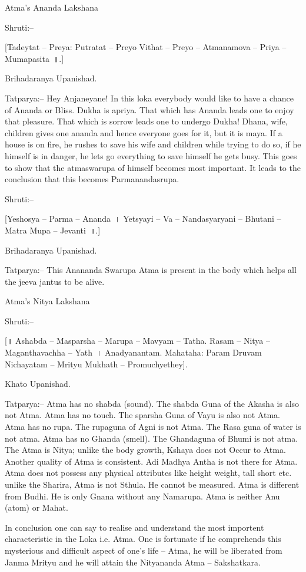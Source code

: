 Atma's Ananda Lakshana

Shruti:–

[Tadeytat – Preya: Putratat – Preyo Vithat – Preyo – Atmanamova – Priya – Mumapasita~॥.]

Brihadaranya Upanishad.

Tatparya:– Hey Anjaneyane! In this loka everybody would like to have a chance of Ananda or Bliss. Dukha is apriya. That which has Ananda leads one to enjoy that pleasure. That which is sorrow leads one to undergo Dukha! Dhana, wife, children gives one ananda and hence everyone goes for it, but it is maya. If a house is on fire, he rushes to save his wife and children while trying to do so, if he himself is in danger, he lets go everything to save himself he gets busy. This goes to show that the atmaswarupa of himself becomes most important. It leads to the conclusion that this becomes Parmanandasrupa.

Shruti:–

[Yeshosya – Parma – Ananda~। Yetsyayi – Va – Nandasyaryani – Bhutani – Matra Mupa – Jevanti~॥.]

Brihadaranya Upanishad.

Tatparya:– This Anananda Swarupa Atma is present in the body which helps all the jeeva jantus to be alive.

Atma's Nitya Lakshana

Shruti:–

[॥ Ashabda – Masparsha – Marupa – Mavyam – Tatha. Rasam – Nitya – Maganthavachha – Yath~। Anadyanantam. Mahataha: Param Druvam Nichayatam – Mrityu Mukhath – Promuchyethey].

Khato Upanishad.

Tatparya:– Atma has no shabda (sound). The shabda Guna of the Akasha is also not Atma. Atma has no touch. The sparsha Guna of Vayu is also not Atma. Atma has no rupa. The rupaguna of Agni is not Atma. The Rasa guna of water is not atma. Atma has no Ghanda (smell). The Ghandaguna of Bhumi is not atma. The Atma is Nitya; unlike the body growth, Kshaya does not Occur to Atma. Another quality of Atma is consistent. Adi Madhya Antha is not there for Atma. Atma does not possess any physical attributes like height weight, tall short etc. unlike the Sharira, Atma is not Sthula. He cannot be measured. Atma is different from Budhi. He is only Gnana without any Namarupa. Atma is neither Anu (atom) or Mahat.

In conclusion one can say to realise and understand the most importent characteristic in the Loka i.e. Atma. One is fortunate if he comprehends this mysterious and difficult aspect of one's life – Atma, he will be liberated from Janma Mrityu and he will attain the Nityananda Atma – Sakshatkara.

